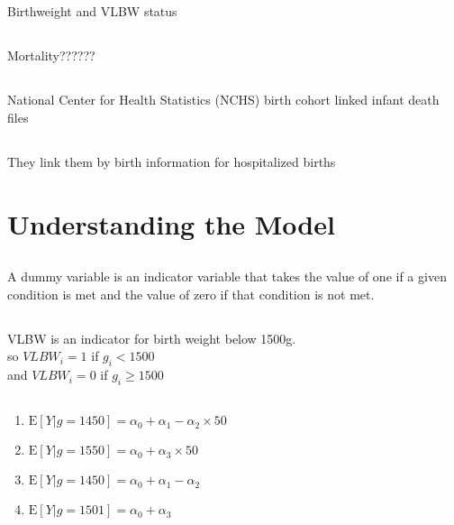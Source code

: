 \documentclass[11pt]{article}
\newcommand{\E}{\mathrm{E}}
\begin{document}
\subsection{}
Birthweight and VLBW status
\subsection{}
Mortality??????

\subsection{}
National Center for Health Statistics (NCHS) birth cohort linked infant death files 

\subsection{}
They link them by birth information for hospitalized births

\section{Understanding the Model}

\subsection{}
 A dummy variable is an indicator variable that takes the value of one if a given condition is met and      the value of zero if that condition is not met. 
 
 \subsection{}
 VLBW is an indicator for birth weight below 1500g. \\
 so $VLBW_i = 1 $ if $g_i < 1500$ \\
 and  $VLBW_i = 0 $ if $g_i \geq 1500$
 
 \subsection{}
 
  \renewcommand{\theenumi}{\roman{enumi}}
  \begin{enumerate}
  	\item $\E[Y|g=1450] = \alpha_0 + \alpha_1 - \alpha_2 \times 50 $
  	\item $\E[Y|g=1550] = \alpha_0 + \alpha_3 \times 50 $
  	\item$\E[Y|g=1450] = \alpha_0 + \alpha_1 - \alpha_2$
  		\item $\E[Y|g=1501] = \alpha_0 + \alpha_3$
  \end{enumerate}
\end{document}
